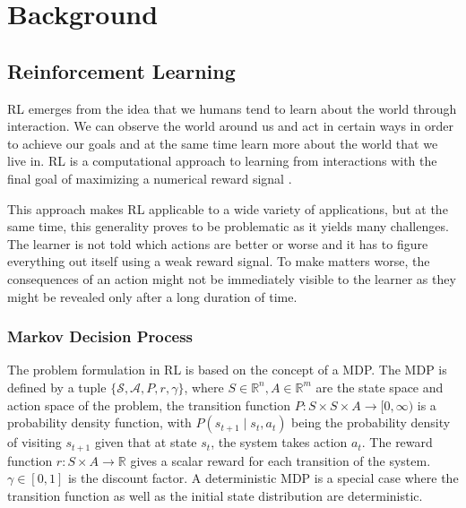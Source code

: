\chapter{Background}
\label{ch:background}

\section{Reinforcement Learning}


\label{sec:background_rl}

\ac{RL} emerges from the idea that we humans tend to learn about the world through interaction. We can observe the world around us and act in certain ways in order to achieve our goals and at the same time learn more about the world that we live in. \ac{RL} is a computational approach to learning from interactions with the final goal of maximizing a numerical reward signal \cite{rlbook}.

This approach makes \ac{RL} applicable to a wide variety of applications, but at the same time, this generality proves to be problematic as it yields many challenges. The learner is not told which actions are better or worse and it has to figure everything out itself using a weak reward signal. To make matters worse, the consequences of an action might not be immediately visible to the learner as they might be revealed only after a long duration of time.


\subsection{Markov Decision Process}

The problem formulation in \ac{RL} is based on the concept of a \ac{MDP}. The \ac{MDP} is defined by a tuple $\{\mathcal{S}, \mathcal{A}, P, r, \gamma\}$, where $S \in \mathbb R^n, A \in \mathbb R^m$ are the state space and action space of the problem, the transition function $P: S \times S \times A \to [0, \infty)$ 
is a probability density function, with $P(s_{t+1} \mid s_t, a_t)$ being the probability density of visiting $s_{t+1}$ given that at state $s_t$, the system takes action $a_t$.
The reward function $r: S\times A \to \mathbb R$ gives a scalar reward for each transition of the system. 
$\gamma \in [0, 1]$ is the discount factor. A deterministic \ac{MDP} is a special case where the transition function as well as the initial state distribution are deterministic.

